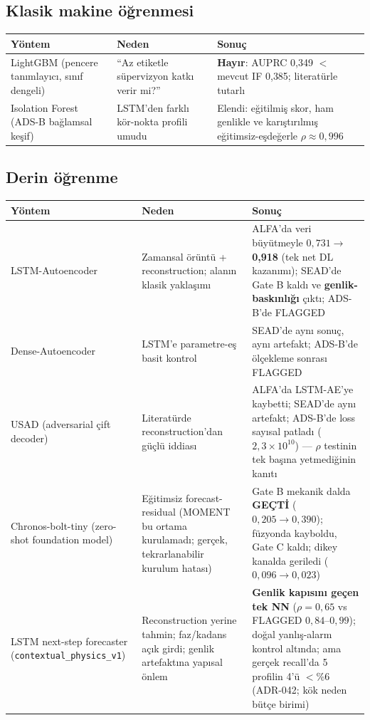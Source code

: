 \documentclass[11pt,a4paper]{article}
\newcommand{\code}[1]{\texttt{\small #1}}
\newcommand{\gatefail}[1]{\textcolor{failred}{\textbf{#1}}}
\newcommand{\gatepass}[1]{\textcolor{okgreen}{\textbf{#1}}}
\begin{document}
\subsection{Klasik makine öğrenmesi}

\begin{small}
\begin{tabularx}{\textwidth}{@{}p{}p{}L@{}}
\toprule
\textbf{Yöntem} & \textbf{Neden} & \textbf{Sonuç} \\
\midrule
LightGBM (pencere tanımlayıcı, sınıf dengeli) &
``Az etiketle süpervizyon katkı verir mi?'' &
\gatefail{Hayır}: AUPRC 0{,}349 $<$ mevcut IF 0{,}385; literatürle tutarlı \\
\addlinespace
Isolation Forest (ADS-B bağlamsal keşif) &
LSTM'den farklı kör-nokta profili umudu &
Elendi: eğitilmiş skor, ham genlikle ve karıştırılmış eğitimsiz-eşdeğerle
$\rho \approx 0{,}996$ \\
\bottomrule
\end{tabularx}
\end{small}

\subsection{Derin öğrenme}

\begin{small}
\begin{longtable}{@{}p{}p{}p{}@{}}
\toprule
\textbf{Yöntem} & \textbf{Neden} & \textbf{Sonuç} \\
\midrule
\endhead
LSTM-Autoencoder &
Zamansal örüntü + reconstruction; alanın klasik yaklaşımı &
ALFA'da veri büyütmeyle $0{,}731 \to$ \gatepass{0{,}918} (tek net DL kazanımı);
SEAD'de Gate B kaldı ve \textbf{genlik-baskınlığı} çıktı; ADS-B'de FLAGGED \\
\addlinespace
Dense-Autoencoder &
LSTM'e parametre-eş basit kontrol &
SEAD'de aynı sonuç, aynı artefakt; ADS-B'de ölçekleme sonrası FLAGGED \\
\addlinespace
USAD (adversarial çift decoder) &
Literatürde reconstruction'dan güçlü iddiası &
ALFA'da LSTM-AE'ye kaybetti; SEAD'de aynı artefakt; ADS-B'de loss sayısal patladı
($2{,}3\times10^{10}$) --- $\rho$ testinin tek başına yetmediğinin kanıtı \\
\addlinespace
Chronos-bolt-tiny (zero-shot foundation model) &
Eğitimsiz forecast-residual (MOMENT bu ortama kurulamadı; gerçek, tekrarlanabilir
kurulum hatası) &
Gate B mekanik dalda \gatepass{GEÇTİ} ($0{,}205 \to 0{,}390$); füzyonda kayboldu,
Gate C kaldı; dikey kanalda geriledi ($0{,}096 \to 0{,}023$) \\
\addlinespace
LSTM next-step forecaster (\code{contextual\_physics\_v1}) &
Reconstruction yerine tahmin; faz/kadans açık girdi; genlik artefaktına yapısal
önlem &
\gatepass{Genlik kapısını geçen tek NN} ($\rho = 0{,}65$ vs FLAGGED
$0{,}84$--$0{,}99$); doğal yanlış-alarm kontrol altında; ama gerçek recall'da
5 profilin 4'ü $<$\%6 (ADR-042; kök neden bütçe birimi) \\
\bottomrule
\end{longtable}
\end{small}
\end{document}
